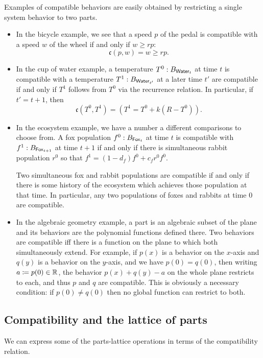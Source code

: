 \begin{ex}
Examples of compatible behaviors are easily obtained by restricting a single system behavior to two parts.
\begin{itemize}
\item In the bicycle example, we see that a speed $p$ of the pedal is compatible with a speed $w$ of the wheel if and only if $w \geq rp$:
$$\mathfrak{c}(p, w) = w \geq rp.$$

\item In the cup of water example, a temperature $T^0 : B_{\mathsf{{Water}}_t}$ at time $t$ is compatible with a temperature $T^1 : B_{\mathsf{{Water}}_{t'}}$ at a later time $t'$ are compatible if and only if $T^1$ follows from $T^0$ via the recurrence relation. In particular, if $t' = t + 1$, then
$$\mathfrak{c}(T^0, T^1) = (T^1 = T^0 + k(R - T^0)).$$

\item In the ecosystem example, we have a number a different comparisons to choose from. A fox population $f^0 : B_{\mathsf{{Fox}}_t}$ at time $t$ is compatible with $f^1 : B_{\mathsf{{Fox}}_{t + 1}}$ at time $t + 1$ if and only if there is simultaneous rabbit population $r^0$ so that $f^1 = (1 - d_f)f^0 + c_f r^0 f^0$. 

Two simultaneous fox and rabbit populations are compatible if and only if there is some history of the ecosystem which achieves those population at that time. In particular, any two populations of foxes and rabbits at time $0$ are compatible.

\item In the algebraic geometry example, a part is an algebraic subset of the plane and its behaviors are the polynomial functions defined there. Two behaviors are compatible iff there is a function on the plane to which both simultaneously extend. For example, if $p(x)$ is a behavior on the $x$-axis and $q(y)$ is a behavior on the $y$-axis, and we have $p(0)=q(0)$, then writing $a\coloneqq p(0)\in\operatorname{\mathbb{R}}$,  the behavior $p(x)+q(y)-a$ on the whole plane  restricts to each, and thus $p$ and $q$ are compatible. This is obviously a necessary condition: if $p(0)\neq q(0)$ then no global function can restrict to both.
\end{itemize}
\end{ex}

\subsection{Compatibility and the lattice of parts}
We can express some of the parts-lattice operations in terms of the compatibility relation.

